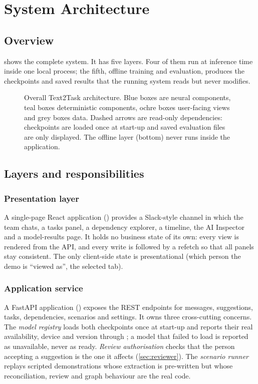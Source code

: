 \chapter{System Architecture}
\label{ch:architecture}

\section{Overview}
 shows the complete system. It has five layers. Four of them run at inference time inside one local process; the fifth, offline training and evaluation, produces the checkpoints and saved results that the running system reads but never modifies.

\begin{figure}[t]
\centering
{}
\caption[Overall system architecture]{Overall Text2Task architecture. Blue boxes are neural components, teal boxes deterministic components, ochre boxes user-facing views and grey boxes data. Dashed arrows are read-only dependencies: checkpoints are loaded once at start-up and saved evaluation files are only displayed. The offline layer (bottom) never runs inside the application.}
\label{fig:architecture}
\end{figure}

\section{Layers and responsibilities}
\subsection{Presentation layer}
A single-page React application () provides a Slack-style channel in which the team chats, a tasks panel, a dependency explorer, a timeline, the AI Inspector and a model-results page. It holds no business state of its own: every view is rendered from the API, and every write is followed by a refetch so that all panels stay consistent. The only client-side state is presentational (which person the demo is ``viewed as'', the selected tab).

\subsection{Application service}
A FastAPI application () exposes the REST endpoints for messages, suggestions, tasks, dependencies, scenarios and settings. It owns three cross-cutting concerns. The \emph{model registry} loads both checkpoints once at start-up and reports their real availability, device and version through ; a model that failed to load is reported as unavailable, never as ready. \emph{Review authorisation} checks that the person accepting a suggestion is the one it affects (\cref{sec:reviewer}). The \emph{scenario runner} replays scripted demonstrations whose extraction is pre-written but whose reconciliation, review and graph behaviour are the real code.

